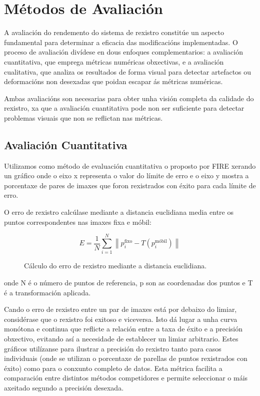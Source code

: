 \section{Métodos de Avaliación}
\label{sec:Métodos de Avaliación}

A avaliación do rendemento do sistema de rexistro constitúe un aspecto fundamental para determinar a eficacia das modificacións implementadas. 
O proceso de avaliación divídese en dous enfoques complementarios: a avaliación cuantitativa, que emprega métricas numéricas obxectivas, e a avaliación cualitativa, que analiza os resultados de forma visual para detectar artefactos ou deformacións non desexadas que poidan escapar ás métricas numéricas.

 Ambas avaliacións son necesarias para obter unha visión completa da calidade do rexistro, xa que a avaliación cuantitativa pode non ser suficiente para detectar problemas visuais que non se reflictan nas métricas.

 \subsection{Avaliación Cuantitativa}
 \label{subsec:Avaliación Cuantitativa}
 
 Utilizamos como método de evaluación cuantitativa o proposto por FIRE \cite{FIRE}
 xerando un gráfico onde o eixo x representa o valor do límite de erro e o eixo y mostra a porcentaxe de pares de imaxes que foron rexistrados con éxito para cada límite de erro.
 
O erro de rexistro calcúlase mediante a distancia euclidiana media entre os puntos correspondentes nas imaxes fixa e móbil:

\begin{figure}[tbp]
    \centering
    \[
    E = \frac{1}{N} \sum_{i=1}^{N} \left\| p_i^{\text{fixo}} - T(p_i^{\text{móbil}}) \right\|
    \]
    \caption{Cálculo do erro de rexistro mediante a distancia euclidiana.}
    \label{fig:erro_registro}
\end{figure}

onde N é o número de puntos de referencia, p son as coordenadas dos puntos e T é a transformación aplicada.

Cando o erro de rexistro entre un par de imaxes está por debaixo do limiar, considérase que o rexistro foi exitoso e viceversa. Isto dá lugar a unha curva monótona e continua que reflicte a relación entre a taxa de éxito e a precisión obxectivo, evitando así a necesidade de establecer un limiar arbitrario. 
Estes gráficos utilízanse para ilustrar a precisión do rexistro tanto para casos individuais (onde se utilizan o porcentaxe de parellas de puntos rexistrados con éxito)
como para o conxunto completo de datos.
Esta métrica facilita a comparación entre distintos métodos competidores e permite seleccionar o máis axeitado segundo a precisión desexada.
 
